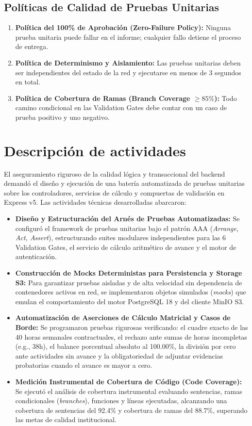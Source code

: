 \documentclass[12pt,a4paper]{article}
\begin{document}
\subsection{Políticas de Calidad de Pruebas Unitarias}
\begin{enumerate}[leftmargin=1.5em, itemsep=2pt]
    \item \textbf{Política del 100\% de Aprobación (Zero-Failure Policy):} Ninguna prueba unitaria puede fallar en el informe; cualquier fallo detiene el proceso de entrega.
    \item \textbf{Política de Determinismo y Aislamiento:} Las pruebas unitarias deben ser independientes del estado de la red y ejecutarse en menos de 3 segundos en total.
    \item \textbf{Política de Cobertura de Ramas (Branch Coverage $\ge 85\%$):} Todo camino condicional en las Validation Gates debe contar con un caso de prueba positivo y uno negativo.
\end{enumerate}

\section{Descripción de actividades}
El aseguramiento riguroso de la calidad lógica y transaccional del backend demandó el diseño y ejecución de una batería automatizada de pruebas unitarias sobre los controladores, servicios de cálculo y compuertas de validación en Express v5. Las actividades técnicas desarrolladas abarcaron:

\begin{itemize}[leftmargin=1.5em, itemsep=4pt]
    \item \textbf{Diseño y Estructuración del Arnés de Pruebas Automatizadas:} Se configuró el framework de pruebas unitarias bajo el patrón AAA (\textit{Arrange, Act, Assert}), estructurando suites modulares independientes para las 6 Validation Gates, el servicio de cálculo aritmético de avance y el motor de autenticación.
    \item \textbf{Construcción de Mocks Deterministas para Persistencia y Storage S3:} Para garantizar pruebas aisladas y de alta velocidad sin dependencia de contenedores activos en red, se implementaron objetos simulados (\textit{mocks}) que emulan el comportamiento del motor PostgreSQL 18 y del cliente MinIO S3.
    \item \textbf{Automatización de Aserciones de Cálculo Matricial y Casos de Borde:} Se programaron pruebas rigurosas verificando: el cuadre exacto de las 40 horas semanales contractuales, el rechazo ante sumas de horas incompletas (e.g., 38h), el balance porcentual absoluto al 100.00\%, la división por cero ante actividades sin avance y la obligatoriedad de adjuntar evidencias probatorias cuando el avance es mayor a cero.
    \item \textbf{Medición Instrumental de Cobertura de Código (Code Coverage):} Se ejecutó el análisis de cobertura instrumental evaluando sentencias, ramas condicionales (\textit{branches}), funciones y líneas ejecutadas, alcanzando una cobertura de sentencias del 92.4\% y cobertura de ramas del 88.7\%, superando las metas de calidad institucional.
\end{itemize}
\end{document}
